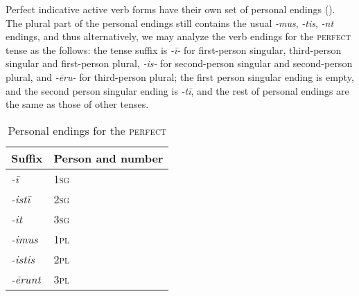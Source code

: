 \documentclass[a4paper, oneside, 12pt]{report}
\newcommand{\form}[1]{\emph{#1}}
\newcommand*{\category}[1]{\textsc{#1}}
\begin{document}
Perfect indicative active verb forms have their own set of personal endings
().
The plural part of the personal endings still contains 
the usual \form{-mus}, \form{-tis}, \form{-nt} endings, 
and thus alternatively, we may analyze the verb endings for the \category{perfect} tense 
as the follows: 
the tense suffix is \form{-ī-}
for first-person singular, third-person singular and first-person plural,
\form{-is-} for second-person singular and second-person plural,
and \form{-\={e}ru-} for third-person plural;
the first person singular ending is empty,
and the second person singular ending is \form{-tī},
and the rest of personal endings are the same as those of other tenses.

\begin{table}[H]
    \centering
    \caption{Personal endings for the \category{perfect}}
    \label{tbl:personal-ending-perfect}
    \begin{tabular}{ll}
        \toprule
        Suffix & Person and number \\
        \midrule
        \form{-ī    } & \category{1sg} \\
        \form{-istī } & \category{2sg} \\
        \form{-it   } & \category{3sg} \\
        \form{-imus } & \category{1pl} \\
        \form{-istis} & \category{2pl} \\
        \form{-\={e}runt} & \category{3pl} \\ 
        \bottomrule
    \end{tabular}
\end{table}
\end{document}
